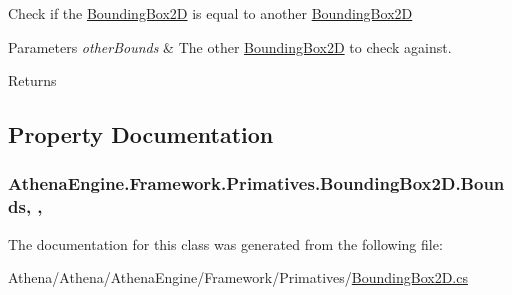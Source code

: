 Check if the \hyperlink{class_athena_engine_1_1_framework_1_1_primatives_1_1_bounding_box2_d}{Bounding\-Box2\-D} is equal to another \hyperlink{class_athena_engine_1_1_framework_1_1_primatives_1_1_bounding_box2_d}{Bounding\-Box2\-D} 


\begin{DoxyParams}{Parameters}
{\em other\-Bounds} & The other \hyperlink{class_athena_engine_1_1_framework_1_1_primatives_1_1_bounding_box2_d}{Bounding\-Box2\-D} to check against.\\
\hline
\end{DoxyParams}
\begin{DoxyReturn}{Returns}

\end{DoxyReturn}


\subsection{Property Documentation}
\hypertarget{class_athena_engine_1_1_framework_1_1_primatives_1_1_bounding_box2_d_aba2448ddc56b8e7857585f11f1e33b51}{
\subsubsection[{Bounds}]{ Athena\-Engine.\-Framework.\-Primatives.\-Bounding\-Box2\-D.\-Bounds\hspace{0.3cm}{\ttfamily [get]}, {\ttfamily [set]}, {\ttfamily [protected]}}}\label{class_athena_engine_1_1_framework_1_1_primatives_1_1_bounding_box2_d_aba2448ddc56b8e7857585f11f1e33b51}


The documentation for this class was generated from the following file\-:\begin{DoxyCompactItemize}
\item 
Athena/\-Athena/\-Athena\-Engine/\-Framework/\-Primatives/\hyperlink{_bounding_box2_d_8cs}{Bounding\-Box2\-D.\-cs}\end{DoxyCompactItemize}
